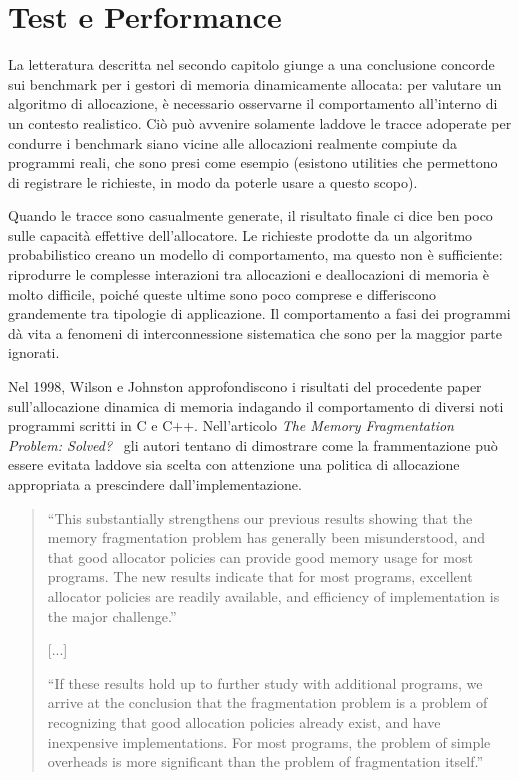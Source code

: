 \chapter[Test e Performance]{Test e Performance}

La letteratura descritta nel secondo capitolo giunge a una conclusione concorde sui benchmark per i gestori di memoria dinamicamente allocata: per valutare un algoritmo di allocazione, è necessario osservarne il comportamento all’interno di un contesto realistico. Ciò può avvenire solamente laddove le tracce adoperate per condurre i benchmark siano vicine alle allocazioni realmente compiute da programmi reali, che sono presi come esempio (esistono utilities che permettono di registrare le richieste, in modo da poterle usare a questo scopo).

Quando le tracce sono casualmente generate, il risultato finale ci dice ben poco sulle capacità effettive dell’allocatore. Le richieste prodotte da un algoritmo probabilistico creano un modello di comportamento, ma questo non è sufficiente: riprodurre le complesse interazioni tra allocazioni e deallocazioni di memoria è molto difficile, poiché queste ultime sono poco comprese e differiscono grandemente tra tipologie di applicazione. Il comportamento a fasi dei programmi dà vita a fenomeni di interconnessione sistematica che sono per la maggior parte ignorati.

Nel 1998, Wilson e Johnston approfondiscono i risultati del procedente paper sull’allocazione dinamica di memoria indagando il comportamento di diversi noti programmi scritti in C e C++. Nell’articolo \emph{The Memory Fragmentation Problem: Solved?}~\cite{wilson1998} gli autori tentano di dimostrare come la frammentazione può essere evitata laddove sia scelta con attenzione una politica di allocazione appropriata a prescindere dall’implementazione.

\begin{quote}
``This substantially strengthens our previous results showing that the memory fragmentation problem has generally been misunderstood, and that good allocator policies can provide good memory usage for most programs. The new results indicate that for most programs, excellent allocator policies are readily available, and efficiency of implementation is the major challenge.''

[...]

``If these results hold up to further study with additional programs, we arrive at the conclusion that the fragmentation problem is a problem of recognizing that good allocation policies already exist, and have inexpensive implementations. For most programs, the problem of simple overheads is more significant than the problem of fragmentation itself.''
\end{quote}

